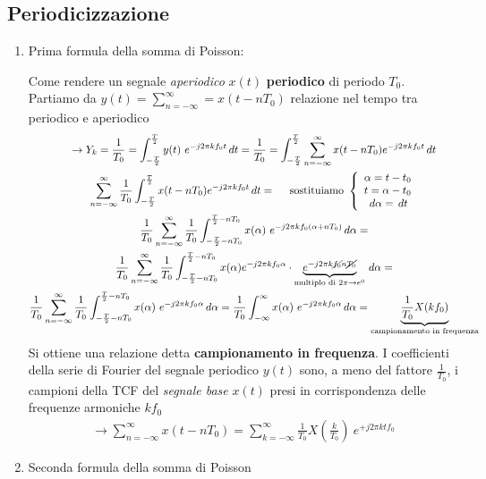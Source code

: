 \documentclass[
  paper=a4,
  ,captions=tableheading
]{scrartcl}
\begin{document}
\subsection{Periodicizzazione}\label{periodicizzazione}

\begin{enumerate}
\def\labelenumi{\arabic{enumi}.}
\setcounter{enumi}{23}
\item
  Prima formula della somma di Poisson:

  Come rendere un segnale \emph{aperiodico} \(x(t)\) \textbf{periodico}
  di periodo \(T_0\). Partiamo da
  \(y(t)=\sum_{n=-\infty}^{\infty} = x(t-nT_0)\) relazione nel tempo tra
  periodico e aperiodico \begin{gather*}
  \to Y_k = \frac{1}{T_0} = \int_{-\frac{T}{2}}^{\frac{T}{2}} y(t) \ e^{-j2 \pi kf_{0}t} \,dt = \frac{1}{T_0} = \int_{-\frac{T}{2}}^{\frac{T}{2}} \sum_{n=-\infty}^{\infty} x(t-nT_0) e^{-j2\pi kf_{0}t} \,dt \\
  \sum_{n=-\infty}^{\infty}\frac{1}{T_0} \int_{-\frac{T}{2}}^{\frac{T}{2}} x(t-nT_0)e^{-j2\pi kf_{0}t} \,dt = \ \ \ \text{ sostituiamo } \left\{ \begin{array}{cl} \alpha = t-t_0 \\ t = \alpha -t_0 \\ \,d\alpha = \,dt \end{array}\right.  \\
  \frac{1}{T_0} \sum_{n=-\infty}^{\infty}\frac{1}{T_0} \int_{-\frac{T}{2}-nT_0}^{\frac{T}{2}-nT_0} x(\alpha) \ e^{-j2\pi kf_{0}(\alpha +nT_0)} \,d\alpha = \\
  \frac{1}{T_0} \sum_{n=-\infty}^{\infty}\frac{1}{T_0} \int_{-\frac{T}{2}-nT_0}^{\frac{T}{2}-nT_0} x(\alpha) e^{-j2\pi kf_{0}\alpha} \cdot \underbrace{e^{-j2\pi k\cancel{f_0}n\cancel{T_0}}}_{\text{multiplo di }2\pi \to e^{0}} \,d\alpha= \\
  \frac{1}{T_0} \sum_{n=-\infty}^{\infty}\frac{1}{T_0} \int_{-\frac{T}{2}-nT_0}^{\frac{T}{2}-nT_0} x(\alpha) \ e^{-j2\pi kf_{0}\alpha} \,d\alpha =
  \frac{1}{T_0} \int_{-\infty}^{\infty}x(\alpha) \ e^{-j2\pi kf_{0}\alpha}\,d\alpha = \underbrace{\frac{1}{T_0}X(kf_0)}_{\text{campionamento in frequenza}}
  \end{gather*} Si ottiene una relazione detta \textbf{campionamento in
  frequenza}. I coefficienti della serie di Fourier del segnale
  periodico \(y(t)\) sono, a meno del fattore \(\frac{1}{T_0}\), i
  campioni della TCF del \emph{segnale base} \(x(t)\) presi in
  corrispondenza delle frequenze armoniche \(kf_0\) \begin{gather*}
  \to \sum_{n=-\infty}^{\infty}x(t-nT_0) = \sum_{k=-\infty}^{\infty} \frac{1}{T_0} X(\frac{k}{T_0})\ e^{+j2\pi kt f_0}
  \end{gather*}
\item
  Seconda formula della somma di Poisson


\end{enumerate}
\end{document}
